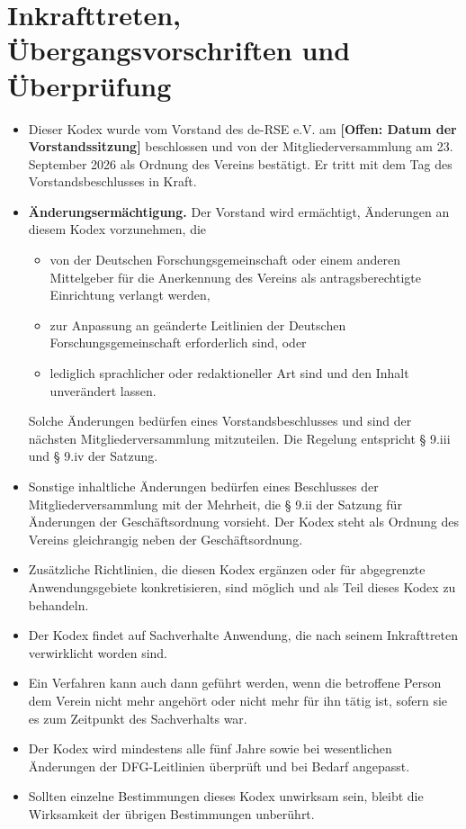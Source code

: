 \documentclass[a4paper, fontsize=11pt]{scrartcl}
\newcommand{\offen}[1]{\textbf{[Offen: #1]}}
\begin{document}
\section{Inkrafttreten, Übergangsvorschriften und Überprüfung}
\begin{itemize}
  \item Dieser Kodex wurde vom Vorstand des de-RSE e.V. am \offen{Datum der Vorstandssitzung} beschlossen und von der Mitgliederversammlung am 23. September 2026 als Ordnung des Vereins bestätigt. Er tritt mit dem Tag des Vorstandsbeschlusses in Kraft. 
  \item \textbf{Änderungsermächtigung.} Der Vorstand wird ermächtigt, Änderungen an diesem Kodex vorzunehmen, die
  \begin{itemize}
    \item von der Deutschen Forschungsgemeinschaft oder einem anderen Mittelgeber für die Anerkennung des Vereins als antragsberechtigte Einrichtung verlangt werden,
    \item zur Anpassung an geänderte Leitlinien der Deutschen Forschungsgemeinschaft erforderlich sind, oder
    \item lediglich sprachlicher oder redaktioneller Art sind und den Inhalt unverändert lassen.
  \end{itemize}
  Solche Änderungen bedürfen eines Vorstandsbeschlusses und sind der nächsten Mitgliederversammlung mitzuteilen. Die Regelung entspricht § 9.iii und § 9.iv der Satzung.
  \item Sonstige inhaltliche Änderungen bedürfen eines Beschlusses der Mitgliederversammlung mit der Mehrheit, die § 9.ii der Satzung für Änderungen der Geschäftsordnung vorsieht. Der Kodex steht als Ordnung des Vereins gleichrangig neben der Geschäftsordnung.
  \item Zusätzliche Richtlinien, die diesen Kodex ergänzen oder für abgegrenzte Anwendungsgebiete konkretisieren, sind möglich und als Teil dieses Kodex zu behandeln.
  \item Der Kodex findet auf Sachverhalte Anwendung, die nach seinem Inkrafttreten verwirklicht worden sind.
  \item Ein Verfahren kann auch dann geführt werden, wenn die betroffene Person dem Verein nicht mehr angehört oder nicht mehr für ihn tätig ist, sofern sie es zum Zeitpunkt des Sachverhalts war.
  \item Der Kodex wird mindestens alle fünf Jahre sowie bei wesentlichen Änderungen der DFG-Leitlinien überprüft und bei Bedarf angepasst.
  \item Sollten einzelne Bestimmungen dieses Kodex unwirksam sein, bleibt die Wirksamkeit der übrigen Bestimmungen unberührt.
\end{itemize}
\end{document}

